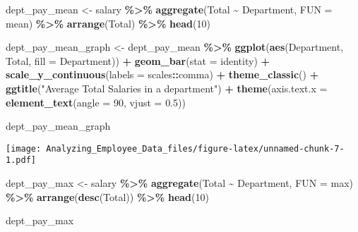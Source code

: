 \documentclass[
]{article}
\newenvironment{Shaded}{\begin{snugshade}}{\end{snugshade}}
\newcommand{\AttributeTok}[1]{\textcolor[rgb]{0.13,0.29,0.53}{#1}}
\newcommand{\DecValTok}[1]{\textcolor[rgb]{0.00,0.00,0.81}{#1}}
\newcommand{\FloatTok}[1]{\textcolor[rgb]{0.00,0.00,0.81}{#1}}
\newcommand{\FunctionTok}[1]{\textcolor[rgb]{0.13,0.29,0.53}{\textbf{#1}}}
\newcommand{\NormalTok}[1]{#1}
\newcommand{\OtherTok}[1]{\textcolor[rgb]{0.56,0.35,0.01}{#1}}
\newcommand{\SpecialCharTok}[1]{\textcolor[rgb]{0.81,0.36,0.00}{\textbf{#1}}}
\newcommand{\StringTok}[1]{\textcolor[rgb]{0.31,0.60,0.02}{#1}}
\begin{document}
\begin{Shaded}
\begin{Highlighting}[]
\NormalTok{dept\_pay\_mean }\OtherTok{\textless{}{-}}\NormalTok{ salary }\SpecialCharTok{\%\textgreater{}\%} 
  \FunctionTok{aggregate}\NormalTok{(Total }\SpecialCharTok{\textasciitilde{}}\NormalTok{ Department,}
            \AttributeTok{FUN =}\NormalTok{ mean) }\SpecialCharTok{\%\textgreater{}\%} 
  \FunctionTok{arrange}\NormalTok{(Total) }\SpecialCharTok{\%\textgreater{}\%} 
  \FunctionTok{head}\NormalTok{(}\DecValTok{10}\NormalTok{)}


\NormalTok{dept\_pay\_mean\_graph }\OtherTok{\textless{}{-}} 
\NormalTok{  dept\_pay\_mean }\SpecialCharTok{\%\textgreater{}\%}
  \FunctionTok{ggplot}\NormalTok{(}\FunctionTok{aes}\NormalTok{(Department,}
\NormalTok{             Total,}
             \AttributeTok{fill =}\NormalTok{ Department)) }\SpecialCharTok{+} 
  \FunctionTok{geom\_bar}\NormalTok{(}\AttributeTok{stat =} \StringTok{\textquotesingle{}identity\textquotesingle{}}\NormalTok{) }\SpecialCharTok{+}
  \FunctionTok{scale\_y\_continuous}\NormalTok{(}\AttributeTok{labels =}\NormalTok{ scales}\SpecialCharTok{::}\NormalTok{comma) }\SpecialCharTok{+} 
  \FunctionTok{theme\_classic}\NormalTok{() }\SpecialCharTok{+} 
 \FunctionTok{ggtitle}\NormalTok{(}\StringTok{"Average Total Salaries in a department"}\NormalTok{) }\SpecialCharTok{+} \FunctionTok{theme}\NormalTok{(}\AttributeTok{axis.text.x =} \FunctionTok{element\_text}\NormalTok{(}\AttributeTok{angle =} \DecValTok{90}\NormalTok{, }\AttributeTok{vjust =} \FloatTok{0.5}\NormalTok{))}


\NormalTok{dept\_pay\_mean\_graph}
\end{Highlighting}
\end{Shaded}

\texttt{[image: Analyzing\_Employee\_Data\_files/figure-latex/unnamed-chunk-7-1.pdf]}

\begin{Shaded}
\begin{Highlighting}[]
\NormalTok{dept\_pay\_max }\OtherTok{\textless{}{-}}\NormalTok{ salary }\SpecialCharTok{\%\textgreater{}\%} 
  \FunctionTok{aggregate}\NormalTok{(Total }\SpecialCharTok{\textasciitilde{}}\NormalTok{ Department,}
            \AttributeTok{FUN =}\NormalTok{ max) }\SpecialCharTok{\%\textgreater{}\%} \FunctionTok{arrange}\NormalTok{(}\FunctionTok{desc}\NormalTok{(Total)) }\SpecialCharTok{\%\textgreater{}\%} \FunctionTok{head}\NormalTok{(}\DecValTok{10}\NormalTok{)}

\NormalTok{dept\_pay\_max}
\end{Highlighting}
\end{Shaded}
\end{document}
